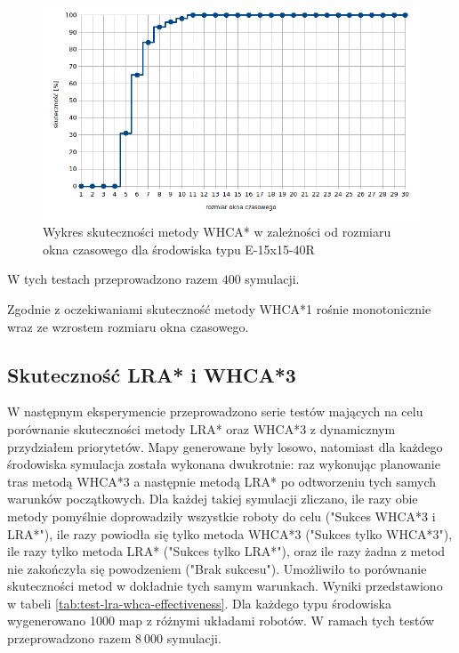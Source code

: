 \begin{figure}
	\centering
	\includegraphics[width=0.8\columnwidth]{img/plots/test-whca-window-E-15x15-40R}
	\caption{Wykres skuteczności metody WHCA* w zależności od rozmiaru okna czasowego dla środowiska typu E-15x15-40R}
	\label{fig:test-whca-window-E-15x15-40R}
\end{figure}

W tych testach przeprowadzono razem $400$ symulacji.

Zgodnie z oczekiwaniami skuteczność metody WHCA*1 rośnie monotonicznie wraz ze wzrostem rozmiaru okna czasowego.

\subsection{Skuteczność LRA* i WHCA*3} %
W następnym eksperymencie przeprowadzono serie testów mających na celu porównanie skuteczności metody LRA* oraz WHCA*3 z dynamicznym przydziałem priorytetów.
Mapy generowane były losowo, natomiast dla każdego środowiska symulacja została wykonana dwukrotnie: raz wykonując planowanie tras metodą WHCA*3 a następnie metodą LRA* po odtworzeniu tych samych warunków początkowych.
Dla każdej takiej symulacji zliczano, ile razy obie metody pomyślnie doprowadziły wszystkie roboty do celu ("Sukces WHCA*3 i LRA*"), ile razy powiodła się tylko metoda WHCA*3 ("Sukces tylko WHCA*3"), ile razy tylko metoda LRA* ("Sukces tylko LRA*"), oraz ile razy żadna z metod nie zakończyła się powodzeniem ("Brak sukcesu").
Umożliwiło to porównanie skuteczności metod w dokładnie tych samym warunkach. Wyniki przedstawiono w tabeli \ref{tab:test-lra-whca-effectiveness}.
Dla każdego typu środowiska wygenerowano 1000 map z różnymi układami robotów.
W ramach tych testów przeprowadzono razem $8\ 000$ symulacji.


